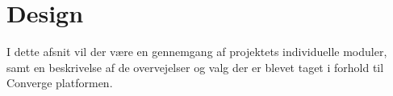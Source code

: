 \chapter{Design}

I dette afsnit vil der være en gennemgang af projektets individuelle moduler, samt en beskrivelse af de overvejelser og valg der er blevet taget i forhold til Converge platformen.